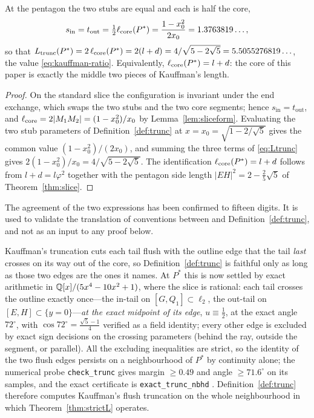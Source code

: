 \begin{proposition}\label{prop:convention}
At the pentagon the two stubs are equal and each is half the core,
\[
  s_{\mathrm{in}}=t_{\mathrm{out}}=\tfrac12\ell_{\mathrm{core}}(P^*)=\frac{1-x_0^2}{2x_0}=1.3763819\ldots,
\]
so that $L_{\mathrm{trunc}}(P^*)=2\,\ell_{\mathrm{core}}(P^*)=2(l+d)=4/\sqrt{5-2\sqrt5}=5.5055276819\ldots$, the value \eqref{eq:kauffman-ratio}. Equivalently, $\ell_{\mathrm{core}}(P^*)=l+d$: the core of this paper is exactly the middle two pieces of Kauffman's length.
\end{proposition}

\begin{proof}
On the standard slice the configuration is invariant under the end exchange, which swaps the two stubs and the two core segments; hence $s_{\mathrm{in}}=t_{\mathrm{out}}$, and $\ell_{\mathrm{core}}=2|M_1M_2|=(1-x_0^2)/x_0$ by Lemma~\ref{lem:sliceform}. Evaluating the two stub parameters of Definition~\ref{def:trunc} at $x=x_0=\sqrt{1-2/\sqrt5}$ gives the common value $(1-x_0^2)/(2x_0)$, and summing the three terms of \eqref{eq:Ltrunc} gives $2(1-x_0^2)/x_0=4/\sqrt{5-2\sqrt5}$. The identification $\ell_{\mathrm{core}}(P^*)=l+d$ follows from $l+d=l\varphi^2$ together with the pentagon side length $|EH|^2=2-\frac25\sqrt5$ of Theorem~\ref{thm:slice}.
\end{proof}

The agreement of the two expressions has been confirmed to fifteen digits. It is used to validate the translation of conventions between \cite{kauffman2004} and Definition~\ref{def:trunc}, and not as an input to any proof below.

\begin{remark}\label{rem:trunclines}
Kauffman's truncation cuts each tail flush with the outline edge that the tail \emph{last} crosses on its way out of the core, so Definition~\ref{def:trunc} is faithful only as long as those two edges are the ones it names. At $P^*$ this is now settled by exact arithmetic in $\mathbb{Q}[x]/(5x^4-10x^2+1)$, where the slice is rational: each tail crosses the outline exactly once---the in-tail on $[G,Q_1]\subset\ell_2$, the out-tail on $[E,H]\subset\{y=0\}$---\emph{at the exact midpoint of its edge}, $u\equiv\tfrac12$, at the exact angle $72^\circ$, with $\cos72^\circ=\tfrac{\sqrt5-1}4$ verified as a field identity; every other edge is excluded by exact sign decisions on the crossing parameters (behind the ray, outside the segment, or parallel). All the excluding inequalities are strict, so the identity of the two flush edges persists on a neighbourhood of $P^*$ by continuity alone; the numerical probe \texttt{check\_trunc} gives margin $\ge0.49$ and angle $\ge71.6^\circ$ on its samples, and the exact certificate is \texttt{exact\_trunc\_nbhd} \cite{anc}. Definition~\ref{def:trunc} therefore computes Kauffman's flush truncation on the whole neighbourhood in which Theorem~\ref{thm:strictL} operates.
\end{remark}

